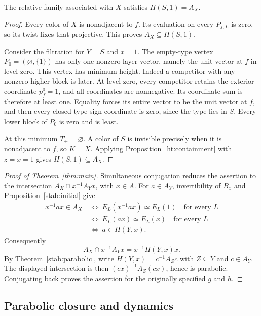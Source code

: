 \begin{proposition}
\label{stab:initial}
The relative family associated with $X$ satisfies $H(S,1)=A_X$.
\end{proposition}
\begin{proof}
Every color of $X$ is nonadjacent to $f$. Its evaluation on every
$P_{f,L}$ is zero, so its twist fixes that projective. This proves
$A_X\subseteq H(S,1)$.

Consider the filtration for $Y=S$ and $x=1$. The empty-type vertex
$P_0=(\varnothing,\{1\})$ has only one nonzero layer vector, namely
the unit vector at $f$ in level zero. This vertex has minimum height.
Indeed a competitor with any nonzero higher block is later. At level
zero, every competitor retains the exterior coordinate $p_f^0=1$, and
all coordinates are nonnegative. Its coordinate sum is therefore at
least one. Equality forces its entire vector to be the unit vector at
$f$, and then every closed-type sign coordinate is zero, since the
type lies in $S$. Every lower block of $P_0$ is zero and is least.

At this minimum $T_+=\varnothing$. A color of $S$ is invisible precisely
when it is nonadjacent to $f$, so $K=X$. Applying
Proposition~\ref{ht:containment} with $z=x=1$ gives
$H(S,1)\subseteq A_X$.
\end{proof}

\begin{proof}[Proof of Theorem~\ref{thm:main}]
Simultaneous conjugation reduces the assertion to the intersection
$A_X\cap x^{-1}A_Yx$, with $x\in A$. For $a\in A_Y$, invertibility
of $B_x$ and Proposition~\ref{stab:initial} give
\begin{align*}
 x^{-1}ax\in A_X
 &\ \Longleftrightarrow\ 
 E_L(x^{-1}ax)\simeq E_L(1)\quad\text{for every }L\\
 &\ \Longleftrightarrow\ 
 E_L(ax)\simeq E_L(x)\quad\text{for every }L\\
 &\ \Longleftrightarrow\ a\in H(Y,x).
\end{align*}
Consequently
\[
 A_X\cap x^{-1}A_Yx=x^{-1}H(Y,x)x.
\]
By Theorem~\ref{stab:parabolic}, write $H(Y,x)=c^{-1}A_Zc$ with
$Z\subseteq Y$ and $c\in A_Y$. The displayed intersection is then
$(cx)^{-1}A_Z(cx)$, hence is parabolic. Conjugating back proves the
assertion for the originally specified $g$ and $h$.
\end{proof}


\subsection{Parabolic closure and dynamics}
\label{sec:consequences}

